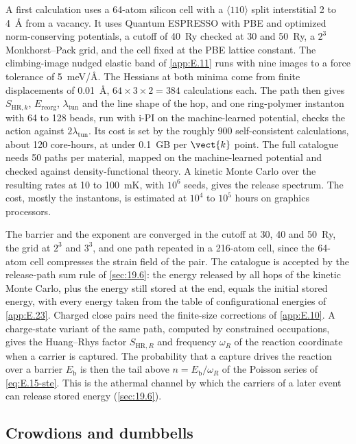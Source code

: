 A first calculation uses a 64-atom silicon cell with a $\langle110\rangle$ split interstitial 2 to \SI{4}{\angstrom} from a vacancy. It uses Quantum ESPRESSO with PBE and optimized norm-conserving potentials, a cutoff of \SI{40}{Ry} checked at 30 and \SI{50}{Ry}, a $2^3$ Monkhorst--Pack grid, and the cell fixed at the PBE lattice constant. The climbing-image nudged elastic band of \cref{app:E.11} runs with nine images to a force tolerance of \SI{5}{meV/\angstrom}. The Hessians at both minima come from finite displacements of \SI{0.01}{\angstrom}, $64\times3\times2 = 384$ calculations each. The path then gives $S_{\mathrm{HR},k}$, $E_{\mathrm{reorg}}$, $\lambda_{\mathrm{tun}}$ and the line shape of the hop, and one ring-polymer instanton with 64 to 128 beads, run with i-PI on the machine-learned potential, checks the action against $2\lambda_{\mathrm{tun}}$. Its cost is set by the roughly 900 self-consistent calculations, about 120 core-hours, at under \SI{0.1}{GB} per $\vect{k}$ point. The full catalogue needs 50 paths per material, mapped on the machine-learned potential and checked against density-functional theory. A kinetic Monte Carlo over the resulting rates at 10 to \SI{100}{mK}, with $10^6$ seeds, gives the release spectrum. The cost, mostly the instantons, is estimated at $10^4$ to $10^5$ hours on graphics processors.

The barrier and the exponent are converged in the cutoff at 30, 40 and \SI{50}{Ry}, the grid at $2^3$ and $3^3$, and one path repeated in a 216-atom cell, since the 64-atom cell compresses the strain field of the pair. The catalogue is accepted by the release-path sum rule of \cref{sec:19.6}: the energy released by all hops of the kinetic Monte Carlo, plus the energy still stored at the end, equals the initial stored energy, with every energy taken from the table of configurational energies of \cref{app:E.23}. Charged close pairs need the finite-size corrections of \cref{app:E.10}. A charge-state variant of the same path, computed by constrained occupations, gives the Huang--Rhys factor $S_{\mathrm{HR},R}$ and frequency $\omega_R$ of the reaction coordinate when a carrier is captured. The probability that a capture drives the reaction over a barrier $E_{\mathrm{b}}$ is then the tail above $n = E_{\mathrm{b}}/\omega_R$ of the Poisson series of \cref{eq:E.15-ste}. This is the athermal channel by which the carriers of a later event can release stored energy (\cref{sec:19.6}).

\subsection{Crowdions and dumbbells}

